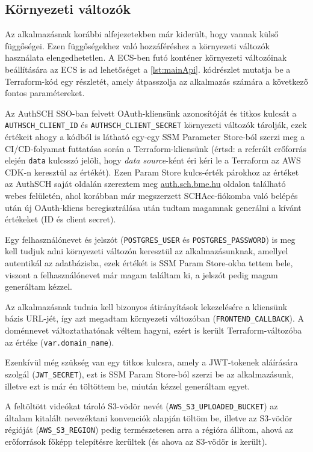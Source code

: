 \subsection{Környezeti változók}\label{sec:envvars}

Az alkalmazásnak korábbi alfejezetekben már kiderült, hogy vannak külső függőségei. Ezen függőségekhez való hozzáféréshez a környezeti változók használata elengedhetetlen. A ECS-ben futó konténer környezeti változóinak beállítására az ECS is ad lehetőséget a \ref{lst:mainApi}. kódrészlet mutatja be a Terraform-kód egy részletét, amely átpasszolja az alkalmazás számára a következő fontos paramétereket.

Az AuthSCH SSO-ban felvett OAuth-kliensünk\cite{ietf-oauth-security-topics-13} azonosítóját és titkos kulcsát a \verb|AUTHSCH_CLIENT_ID| és \verb|AUTHSCH_CLIENT_SECRET| környezeti változók tárolják, ezek értékeit ahogy a kódból is látható egy-egy SSM Parameter Store-ból szerzi meg a CI/CD-folyamat futtatása során a Terraform-kliensünk (értsd: a referált erőforrás elején \verb|data| kulcsszó jelöli, hogy \emph{data source}-ként éri kéri le a Terraform az AWS CDK-n keresztül az értékét). Ezen Param Store kulcs-érték párokhoz az értéket az AuthSCH saját oldalán szereztem meg \url{auth.sch.bme.hu} oldalon található webes felületén, ahol korábban már megszerzett SCHAcc-fiókomba való belépés után új OAuth-kliens beregisztrálása után tudtam magamnak generálni a kívánt értékeket (ID és client secret).

Egy felhasználónevet és jelszót (\verb|POSTGRES_USER| és \verb|POSTGRES_PASSWORD|) is meg kell tudjuk adni környezeti változón keresztül az alkalmazásunknak, amellyel autentikál az adatbázisba, ezek értékét is SSM Param Store-okba tettem bele, viszont a felhasználónevet már magam találtam ki, a jelszót pedig magam generáltam kézzel.

Az alkalmazásnak tudnia kell bizonyos átirányítások lekezelésére a kliensünk bázis URL-jét, így azt megadtam környezeti változóban (\verb|FRONTEND_CALLBACK|). A doménnevet változtathatónak véltem hagyni, ezért is került Terraform-változóba az értéke (\verb|var.domain_name|).

Ezenkívül még szükség van egy titkos kulcsra, amely a JWT-tokenek aláírására szolgál (\verb|JWT_SECRET|), ezt is SSM Param Store-ból szerzi be az alkalmazásunk, illetve ezt is már én töltöttem be, miután kézzel generáltam egyet.

A feltöltött videókat tároló S3-vödör nevét (\verb|AWS_S3_UPLOADED_BUCKET|) az általam kitalált nevezéktani konvenciók alapján töltöm be, illetve az S3-vödör régióját (\verb|AWS_S3_REGION|) pedig természetesen arra a régióra állítom, ahová az erőforrások főképp telepítésre kerültek (és ahova az S3-vödör is került).

